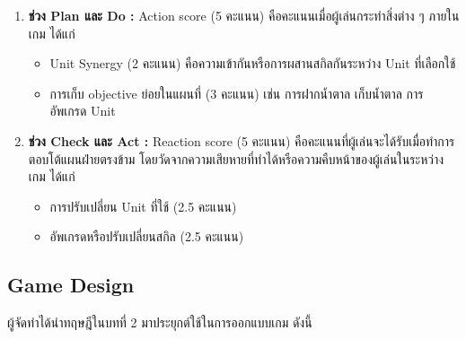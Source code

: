 \documentclass[12pt,oneside,openright,a4paper]{cpe-thai-project}
\begin{document}
  \begin{enumerate}
    \item \textbf{ช่วง Plan และ Do :} Action score (5 คะแนน) 
    คือคะแนนเมื่อผู้เล่นกระทำสิ่งต่าง ๆ ภายในเกม ได้แก่ 
    \begin{itemize}
      \item Unit Synergy (2 คะแนน) คือความเข้ากันหรือการผสานสกิลกันระหว่าง Unit ที่เลือกใช้
      \item การเก็บ objective ย่อยในแผนที่ (3 คะแนน) เช่น การฝากน้ำตาล เก็บน้ำตาล การอัพเกรด Unit
    \end{itemize}

    \item \textbf{ช่วง Check และ Act :} Reaction score (5 คะแนน) 
    คือคะแนนที่ผู้เล่นจะได้รับเมื่อทำการตอบโต้แผนฝ่ายตรงข้าม 
    โดยวัดจากความเสียหายที่ทำได้หรือความคืบหน้าของผู้เล่นในระหว่างเกม ได้แก่
    \begin{itemize}
      \item การปรับเปลี่ยน Unit ที่ใช้ (2.5 คะแนน)
      \item อัพเกรดหรือปรับเปลี่ยนสกิล (2.5 คะแนน)
    \end{itemize}

  \end{enumerate}

\subsection{Game Design}

ผู้จัดทำได้นำทฤษฎีในบทที่ 2 มาประยุกต์ใช้ในการออกแบบเกม ดังนี้
\end{document}
